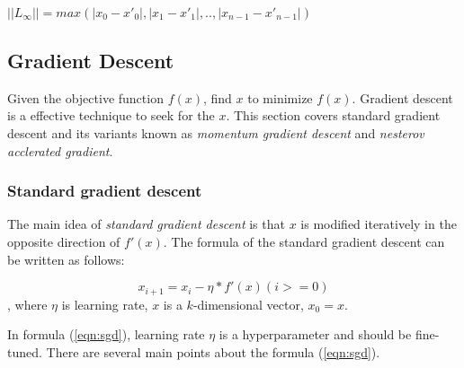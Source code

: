 \documentclass[12pt]{article}
\begin{document}
\begin{center}
	$||L_\infty|| = max(|x_0 - x'_0|, |x_1 - x'_1|, .., |x_{n-1} - x'_{n-1}|)$ 
\end{center}

\subsection{Gradient Descent}

Given the objective function $f(x)$, find $x$ to minimize $f(x)$. Gradient descent is a effective technique to seek for the $x$. This section covers standard gradient descent and its variants known as \textit{momentum gradient descent} and \textit{nesterov acclerated gradient}.

\subsubsection{Standard gradient descent}
	
The main idea of \textit{standard gradient descent} is that $x$ is modified iteratively in the opposite direction of $f'(x)$. The formula of the standard gradient descent can be written as follows:

\begin{equation}
	\label{eqn:sgd}
	x_{i+1} = x_{i} - \eta * f'(x) (i >= 0)
\end{equation}
, where $\eta$ is learning rate, $x$ is a $k$-dimensional vector, $x_0 = x$.

In formula (\ref{eqn:sgd}), learning rate $\eta$ is a hyperparameter and should be fine-tuned. There are several main points about the formula (\ref{eqn:sgd}).
\end{document}
